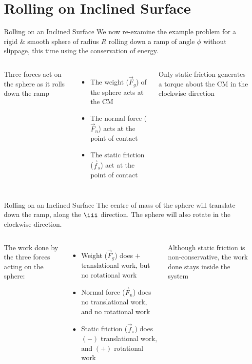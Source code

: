 \documentclass[12pt,compress,aspectratio=169]{beamer}
\begin{document}
\section{Rolling on Inclined Surface}

\begin{frame}{Rolling on an Inclined Surface}
  We now re-examine the example problem for a rigid \& smooth sphere of radius
  $R$ rolling down a ramp of angle  $\phi$ without slippage, this time using
  the conservation of energy.

  \vspace{.2in}
  \begin{columns}
    

    Three forces act on the sphere as it rolls down the ramp
    \begin{itemize}
    \item The weight ($\vec F_g$) of the sphere acts at the CM
    \item The normal force ($\vec F_n$) acts at the point of contact
    \item The static friction ($\vec f_s$) act at the point of contact
    \end{itemize}
    Only static friction generates a torque about the CM in the clockwise
    direction
  \end{columns}
\end{frame}



\begin{frame}{Rolling on an Inclined Surface}
  The centre of mass of the sphere will translate down the ramp, along the
  $\iii$ direction. The sphere will also rotate in the clockwise direction.

  \vspace{.2in}
  \begin{columns}
    

    The work done by the three forces acting on the sphere:
    \begin{itemize}
    \item Weight ($\vec F_g$) does $+$ translational work, but no rotational
      work
    \item Normal force ($\vec F_n$) does no translational work, and no
      rotational work
    \item Static friction ($\vec f_s$) does $(-)$ translational work, and $(+)$
      rotational work
    \end{itemize}
    Although static friction is non-conservative, the work done stays inside
    the system
  \end{columns}    
\end{frame}
\end{document}
